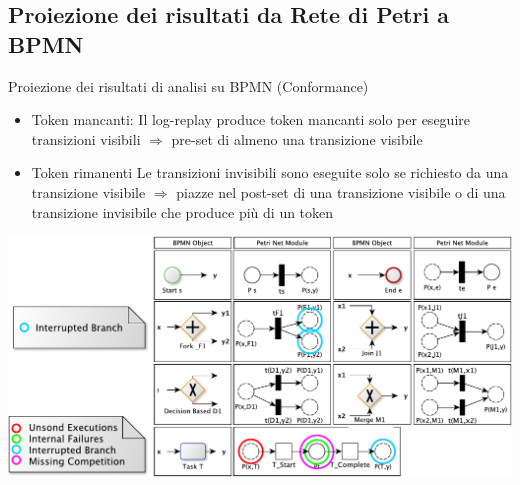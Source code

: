 \documentclass[10pt]{beamer}
\begin{document}
\subsection{Proiezione dei risultati da Rete di Petri a BPMN}
	\begin{frame}{}
	  \begin{block}{Proiezione dei risultati di analisi su BPMN (Conformance)}
	    \begin{itemize}
	      \item \alert{Token mancanti}: Il log-replay produce token mancanti solo per eseguire transizioni visibili  $\Rightarrow$ pre-set di almeno una transizione visibile
	      \item \alert{Token rimanenti} Le transizioni invisibili sono eseguite solo se richiesto da una transizione visibile $\Rightarrow$ 
	        piazze nel  post-set di una transizione visibile  o di una transizione invisibile che produce pi\`{u} di un token
	
	    \end{itemize}
	  \end{block}
	  
	  \begin{center}
	    \includegraphics[scale=0.40]{./fig/MappingBPMNtoPN2}
	  \end{center}
	
	\end{frame}
\end{document}
